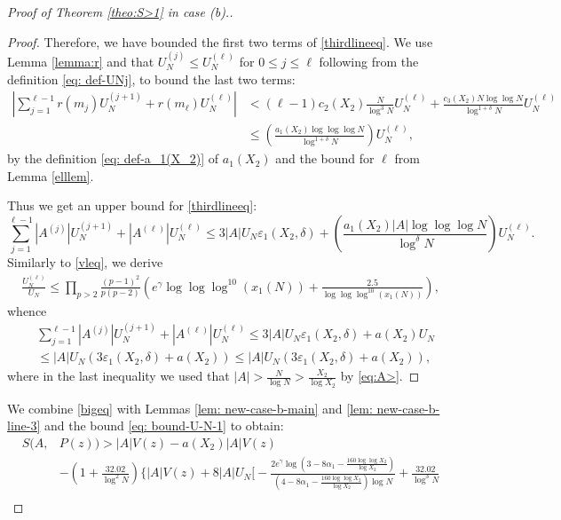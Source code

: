 \documentclass[12pt]{amsart}
\begin{document}
\begin{proof}[Proof of Theorem \ref{theo:S>1} in case (b).]
\begin{proof}
Therefore, we have bounded the first two terms of \eqref{thirdlineeq}. We use Lemma \ref{lemma:r} and that $U_N^{(j)} \le U_N^{(\ell)}$ for $0 \le j \le \ell$ following from the definition \eqref{eq: def-UNj}, to bound the last two terms:
\begin{align*}
    \left| \sum_{j=1}^{\ell-1}r(m_j)U_N^{(j+1)}+r(m_\ell)U_N^{(\ell)}\right| &< (\ell - 1) c_2(X_2) \frac{N}{\log^3 N} U_N^{(\ell)} + \frac{c_3(X_2) N \log \log N}{\log^{1 + \delta} N} U_N^{(\ell)} \\
    &\le \left(\frac{a_1(X_2)\log\log\log N}{\log^{1+\delta}N}\right)U_N^{(\ell)},
\end{align*}
by the definition \eqref{eq: def-a_1(X_2)} of $a_1(X_2)$ and the bound for $\ell$ from Lemma \ref{elllem}.

Thus we get an upper bound for \eqref{thirdlineeq}:
\begin{equation*}
    \sum_{j=1}^{\ell-1}|A^{(j)}|U_N^{(j+1)}+|A^{(\ell)}|U_N^{(\ell)}\le 3|A|U_N\varepsilon_1(X_2,\delta)+\left(\frac{a_1(X_2)|A|\log\log\log N}{\log^{\delta}N}\right)U_N^{(\ell)}.
\end{equation*}
Similarly to \eqref{vleq}, we derive
\begin{align*}
    \frac{U_N^{(\ell)}}{U_N}\le\prod_{p>2}\frac{(p-1)^2}{p(p-2)}\left(e^{\gamma}\log\log\log^{10}(x_1(N))+\frac{2.5}{\log\log\log^{10}(x_1(N))}\right),
\end{align*}
whence
\begin{align*}
    &\sum_{j=1}^{\ell-1}|A^{(j)}|U_N^{(j+1)}+|A^{(\ell)}|U_N^{(\ell)}\le 3|A|U_N\varepsilon_1(X_2,\delta)+a(X_2)U_N \\
    &\le |A|U_N \left(3\varepsilon_1(X_2,\delta) + a(X_2)\right) \le |A|U_N \left(3\varepsilon_1(X_2,\delta) + a(X_2) \right),
\end{align*}
where in the last inequality we used that $|A| > \frac{N}{\log N} > \frac{X_2}{\log X_2}$ by \eqref{eq:A>}.
\end{proof}
We combine \eqref{bigeq} with Lemmas \ref{lem: new-case-b-main} and \ref{lem: new-case-b-line-3} and the bound \eqref{eq: bound-U-N-1} to obtain:
\begin{align}\label{eq: second-last-bound-TheoA}
    S(A,&P(z))> |A|V(z)-a(X_2)|A|V(z) \\
    &-\left(1 + \frac{32.02}{\log^2 N} \right)\Bigg\{|A|V(z)+8|A|U_N\Bigg[-\frac{2e^{\gamma}\log\left(3-8\alpha_1-\frac{160\log\log X_2}{\log X_2}\right)}{(4-8\alpha_1-\frac{160\log\log X_2}{\log X_2})\log N}+\frac{32.02}{\log^3 N} \nonumber\\

\end{align}
\end{proof}
\end{document}
